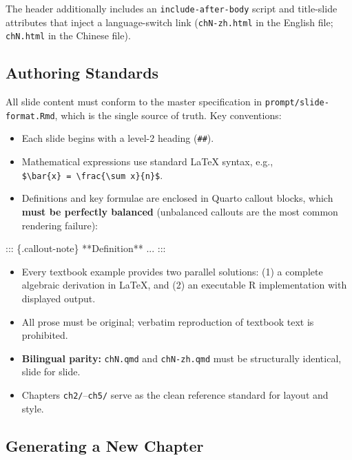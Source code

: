 \documentclass[
]{article}
\newenvironment{Shaded}{\begin{snugshade}}{\end{snugshade}}
\newcommand{\NormalTok}[1]{#1}
\providecommand{\tightlist}{%
  \setlength{\itemsep}{0pt}\setlength{\parskip}{0pt}}
\begin{document}
The header additionally includes an \texttt{include-after-body} script
and title-slide attributes that inject a language-switch link
(\texttt{chN-zh.html} in the English file; \texttt{chN.html} in the
Chinese file).

\subsection{Authoring Standards}\label{authoring-standards}

All slide content must conform to the master specification in
\texttt{prompt/slide-format.Rmd}, which is the single source of truth.
Key conventions:

\begin{itemize}
\tightlist
\item
  Each slide begins with a level-2 heading (\texttt{\#\#}).
\item
  Mathematical expressions use standard LaTeX syntax, e.g.,
  \texttt{\$\textbackslash{}bar\{x\}\ =\ \textbackslash{}frac\{\textbackslash{}sum\ x\}\{n\}\$}.
\item
  Definitions and key formulae are enclosed in Quarto callout blocks,
  which \textbf{must be perfectly balanced} (unbalanced callouts are the
  most common rendering failure):
\end{itemize}

\begin{Shaded}
\begin{Highlighting}[]
\NormalTok{::: \{.callout{-}note\}}
\NormalTok{**Definition** ...}
\NormalTok{:::}
\end{Highlighting}
\end{Shaded}

\begin{itemize}
\tightlist
\item
  Every textbook example provides two parallel solutions: (1) a complete
  algebraic derivation in LaTeX, and (2) an executable R implementation
  with displayed output.
\item
  All prose must be original; verbatim reproduction of textbook text is
  prohibited.
\item
  \textbf{Bilingual parity:} \texttt{chN.qmd} and \texttt{chN-zh.qmd}
  must be structurally identical, slide for slide.
\item
  Chapters \texttt{ch2/}--\texttt{ch5/} serve as the clean reference
  standard for layout and style.
\end{itemize}

\subsection{Generating a New Chapter}\label{generating-a-new-chapter}
\end{document}
